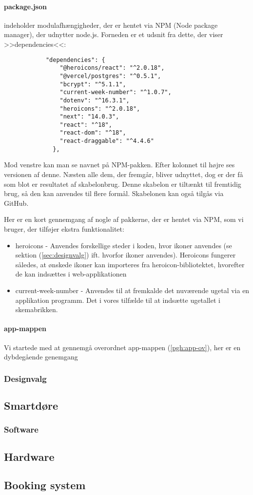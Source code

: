         \paragraph{package.json} indeholder modulafhængigheder, der er hentet via NPM (Node package manager), der udnytter node.js. Forneden er et udsnit fra dette, der viser >>dependencies<<:
        \begin{lstlisting}
            "dependencies": {
                "@heroicons/react": "^2.0.18",
                "@vercel/postgres": "^0.5.1",
                "bcrypt": "^5.1.1",
                "current-week-number": "^1.0.7",
                "dotenv": "^16.3.1",
                "heroicons": "^2.0.18",
                "next": "14.0.3",
                "react": "^18",
                "react-dom": "^18",
                "react-draggable": "^4.4.6"
              }, 
        \end{lstlisting}

        Mod venstre kan man se navnet på NPM-pakken. Efter kolonnet til højre ses versionen af denne. Næsten alle dem, der fremgår, bliver udnyttet, dog er der få som blot er resultatet af skabelonbrug. Denne skabelon er tiltænkt til fremtidig brug, så den kan anvendes til flere formål. Skabelonen kan også tilgås via GitHub.

        Her er en kort gennemgang af nogle af pakkerne, der er hentet via NPM, som vi bruger, der tilføjer ekstra funktionalitet:
        \begin{itemize}
        \item heroicons - Anvendes forskellige steder i koden, hvor ikoner anvendes (se sektion (\ref{sec:designvalg}) ift. hvorfor ikoner anvendes). Heroicons fungerer således, at ønskede ikoner kan importeres fra heroicon-bibliotektet, hvorefter de kan indsættes i web-applikationen
        \item current-week-number - Anvendes til at fremkalde det nuværende ugetal via en applikation programm. Det i vores tilfælde til at indsætte ugetallet i skemabrikken. 
        \end{itemize}

        \paragraph{app-mappen}
            Vi startede med at gennemgå overordnet app-mappen (\ref{pgh:app-ov}), her er en dybdegående genemgang 
        \subsubsection{Designvalg \label{sec:designvalg}}
        \subsection{Smartdøre}
        \subsubsection{Software}
        \subsection{Hardware}
    \subsection{Booking system}
